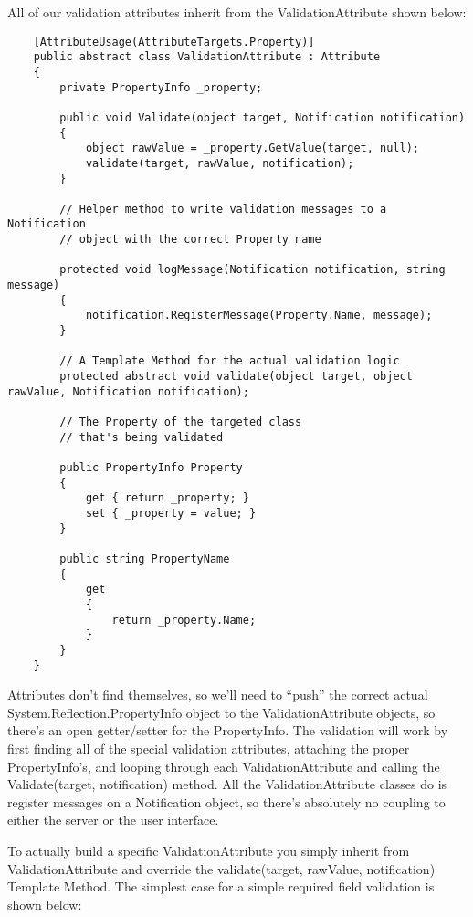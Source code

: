 \documentclass{article}
\begin{document}
{All of our validation attributes inherit from the ValidationAttribute shown below:

 \begin{lstlisting}
    [AttributeUsage(AttributeTargets.Property)]
    public abstract class ValidationAttribute : Attribute
    {
        private PropertyInfo _property;

        public void Validate(object target, Notification notification)
        {
            object rawValue = _property.GetValue(target, null);
            validate(target, rawValue, notification);
        }

        // Helper method to write validation messages to a Notification
        // object with the correct Property name

        protected void logMessage(Notification notification, string message)
        {
            notification.RegisterMessage(Property.Name, message);
        } 

        // A Template Method for the actual validation logic
        protected abstract void validate(object target, object rawValue, Notification notification);

        // The Property of the targeted class
        // that's being validated

        public PropertyInfo Property
        {
            get { return _property; }
            set { _property = value; }
        } 

        public string PropertyName
        {
            get
            {
                return _property.Name;
            }
        }
    }
\end{lstlisting}
 

Attributes don't find themselves, so we'll need to “push” the correct actual System.Reflection.PropertyInfo object to the ValidationAttribute objects, so there's an open getter/setter for the PropertyInfo.  The validation will work by first finding all of the special validation attributes, attaching the proper PropertyInfo's, and looping through each ValidationAttribute and calling the Validate(target, notification) method.  All the ValidationAttribute classes do is register messages on a Notification object, so there's absolutely no coupling to either the server or the user interface.

To actually build a specific ValidationAttribute you simply inherit from ValidationAttribute and override the validate(target, rawValue, notification) Template Method.  The simplest case for a simple required field validation is shown below:

}
\end{document}
